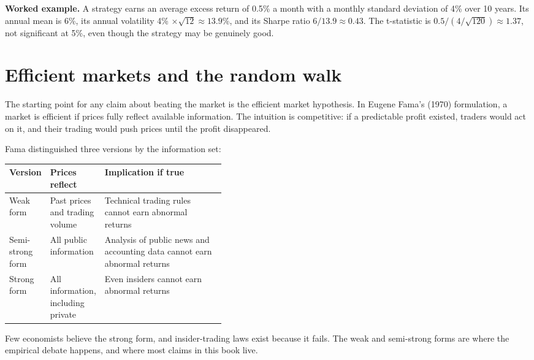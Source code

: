 \textbf{Worked example.} A strategy earns an average excess return of 0.5\% a month with a monthly standard deviation of 4\% over 10 years. Its annual mean is 6\%, its annual volatility 4\% $\times \sqrt{12} \approx 13.9$\%, and its Sharpe ratio $6/13.9 \approx 0.43$. The t-statistic is $0.5 / (4/\sqrt{120}) \approx 1.37$, not significant at 5\%, even though the strategy may be genuinely good.



\section{Efficient markets and the random walk}
\label{sec:01-efficient-markets}

The starting point for any claim about beating the market is the efficient market hypothesis. In Eugene Fama's (1970) formulation, a market is efficient if prices fully reflect available information. The intuition is competitive: if a predictable profit existed, traders would act on it, and their trading would push prices until the profit disappeared.

Fama distinguished three versions by the information set:

\begin{center}
\small
\begin{tabularx}{0.9\linewidth}{@{}>{\raggedright\arraybackslash}p{0.180\linewidth}>{\raggedright\arraybackslash}p{0.234\linewidth}>{\raggedright\arraybackslash}X@{}}
\toprule
Version & Prices reflect & Implication if true \\
\midrule
Weak form & Past prices and trading volume & Technical trading rules cannot earn abnormal returns \\
Semi-strong form & All public information & Analysis of public news and accounting data cannot earn abnormal returns \\
Strong form & All information, including private & Even insiders cannot earn abnormal returns \\
\bottomrule
\end{tabularx}
\end{center}

Few economists believe the strong form, and insider-trading laws exist because it fails. The weak and semi-strong forms are where the empirical debate happens, and where most claims in this book live.

